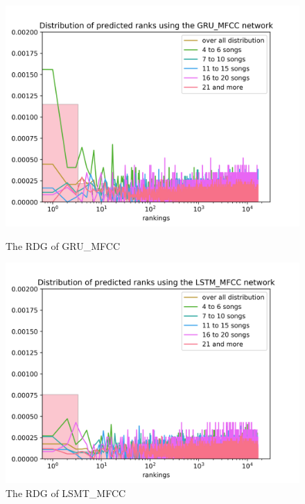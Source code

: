 \begin{figure}[h!]
\centering
\begin{minipage}{.5\textwidth}
  \centering
  \includegraphics[width=1\linewidth]{./img/gru_mfcc_graph.png}
  \caption{The RDG of GRU\_MFCC}
  \label{fig:gru_mfcc_distribution}
\end{minipage}%
\begin{minipage}{.5\textwidth}
  \centering
  \includegraphics[width=1\linewidth]{./img/lstm_mfcc_graph.png}
  \caption{The RDG of LSMT\_MFCC}
  \label{fig:gru_mfcc_distribution}
\end{minipage}
\end{figure}\label{fig:mfcc_nn_distributions}



